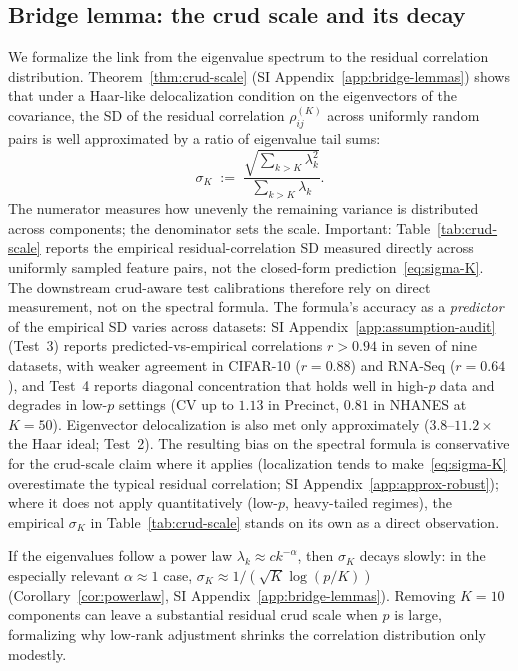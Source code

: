 \subsection{Bridge lemma: the crud scale and its decay}

We formalize the link from the eigenvalue spectrum to the residual correlation distribution. Theorem~\ref{thm:crud-scale} (SI Appendix~\ref{app:bridge-lemmas}) shows that under a Haar-like delocalization condition on the eigenvectors of the covariance, the SD of the residual correlation $\rho^{(K)}_{ij}$ across uniformly random pairs is well approximated by a ratio of eigenvalue tail sums:
\begin{equation}\label{eq:sigma-K}
\sigma_K \;:=\; \frac{\sqrt{\sum_{k>K}\lambda_k^2}}{\sum_{k>K}\lambda_k}.
\end{equation}
The numerator measures how unevenly the remaining variance is distributed across components; the denominator sets the scale. Important: Table~\ref{tab:crud-scale} reports the empirical residual-correlation SD measured directly across uniformly sampled feature pairs, not the closed-form prediction~\eqref{eq:sigma-K}. The downstream crud-aware test calibrations therefore rely on direct measurement, not on the spectral formula. The formula's accuracy as a \emph{predictor} of the empirical SD varies across datasets: SI Appendix~\ref{app:assumption-audit} (Test~3) reports predicted-vs-empirical correlations $r>0.94$ in seven of nine datasets, with weaker agreement in CIFAR-10 ($r=0.88$) and RNA-Seq ($r=0.64$), and Test~4 reports diagonal concentration that holds well in high-$p$ data and degrades in low-$p$ settings (CV up to $1.13$ in Precinct, $0.81$ in NHANES at $K=50$). Eigenvector delocalization is also met only approximately ($3.8$--$11.2\times$ the Haar ideal; Test~2). The resulting bias on the spectral formula is conservative for the crud-scale claim where it applies (localization tends to make~\eqref{eq:sigma-K} overestimate the typical residual correlation; SI Appendix~\ref{app:approx-robust}); where it does not apply quantitatively (low-$p$, heavy-tailed regimes), the empirical $\sigma_K$ in Table~\ref{tab:crud-scale} stands on its own as a direct observation.

If the eigenvalues follow a power law $\lambda_k \approx c k^{-\alpha}$, then $\sigma_K$ decays slowly: in the especially relevant $\alpha \approx 1$ case, $\sigma_K \approx 1/(\sqrt{K}\log(p/K))$ (Corollary~\ref{cor:powerlaw}, SI Appendix~\ref{app:bridge-lemmas}). Removing $K=10$ components can leave a substantial residual crud scale when $p$ is large, formalizing why low-rank adjustment shrinks the correlation distribution only modestly.

